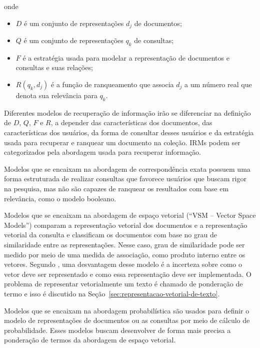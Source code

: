 \documentclass[
	12pt,				%
	openright,			%
	oneside,			%
	a4paper,			%
	english,			%
	french,				%
	spanish,			%
	brazil				%
	]{abntex2}
\begin{document}
onde
\begin{itemize}
    \item \(D\) é um conjunto de representações \(d_j\) de documentos;
    \item \(Q\) é um conjunto de representações \(q_k\) de consultas;
    \item \(F\) é a estratégia usada para modelar a representação de documentos e consultas e suas relações;
    \item \(R(q_k, d_j)\) é a função de ranqueamento que associa \(d_j\) a um número real que denota sua relevância para \(q_k\).
\end{itemize}

Diferentes modelos de recuperação de informação
irão se diferenciar na definição de $D$, $Q$, $F$ e $R$, a depender das
características dos documentos, das características dos usuários, da forma de consultar desses usuários e da estratégia usada para recuperar e ranquear um documento
na coleção.
IRMs podem ser categorizados pela abordagem usada para recuperar informação.

Modelos que se encaixam na abordagem de correspondência exata possuem uma forma estruturada
de realizar consultas que favorece usuários que buscam rigor na pesquisa, mas não
são capazes de ranquear os resultados com base em relevância, como o modelo booleano. \cite{Hiemstra2009}

Modelos que se encaixam na abordagem de espaço vetorial (``VSM -- Vector Space Models'') comparam a representação vetorial dos documentos e a representação
vetorial da consulta e classificam os documentos com base no grau de similaridade entre as representações.
Nesse caso, grau de similaridade pode ser medido por meio de uma medida de associação, como produto interno entre
os vetores.
Segundo \citeauthor{Hiemstra2009}, uma desvantagem desse modelo é a incerteza sobre como o vetor deve ser representado e como
essa representação deve ser implementada.
O problema de representar vetorialmente um texto é chamado de ponderação de termo e isso é discutido na
Seção~\ref{sec:representacao-vetorial-de-texto}.

Modelos que se encaixam na abordagem probabilística são usados para definir o modelo de representações de documentos ou
as consultas por meio de cálculo de probabilidade.
Esses modelos buscam desenvolver de forma mais precisa a ponderação de termos da abordagem de espaço vetorial. \cite{Hiemstra2009}
\end{document}
